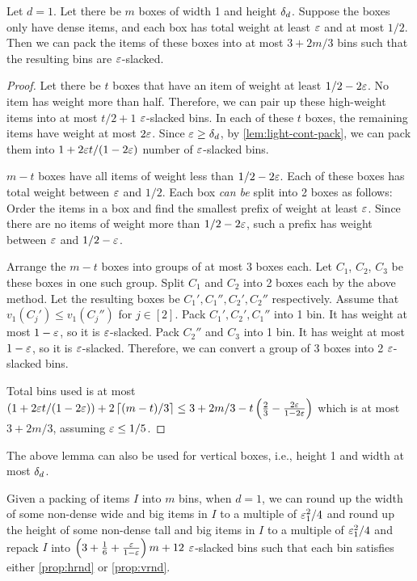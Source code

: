 \begin{lemma}
\label{lem:dense-cont-pack}
Let $d=1$. Let there be $m$ boxes of width 1 and height $\delta_d$.
Suppose the boxes only have dense items,
and each box has total weight at least $\varepsilon$ and at most $1/2$.
Then we can pack the items of these boxes into at most $3 + 2m/3$ bins such that
the resulting bins are $\varepsilon$-slacked.
\end{lemma}
\begin{proof}
Let there be $t$ boxes that have an item of weight at least $1/2-2\varepsilon$.
No item has weight more than half.
Therefore, we can pair up these high-weight items into at most $t/2 + 1$ $\varepsilon$-slacked bins.
In each of these $t$ boxes, the remaining items have weight at most $2\varepsilon$.
Since $\varepsilon \ge \delta_d$, by \cref{lem:light-cont-pack},
we can pack them into $1 + 2\varepsilon t/(1-2\varepsilon)$ number of $\varepsilon$-slacked bins.

$m-t$ boxes have all items of weight less than $1/2-2\varepsilon$.
Each of these boxes has total weight between $\varepsilon$ and $1/2$.
Each box \emph{can be} split into 2 boxes as follows:
Order the items in a box and find the smallest prefix of weight at least $\varepsilon$.
Since there are no items of weight more than $1/2-2\varepsilon$,
such a prefix has weight between $\varepsilon$ and $1/2-\varepsilon$.

Arrange the $m-t$ boxes into groups of at most 3 boxes each.
Let $C_1$, $C_2$, $C_3$ be these boxes in one such group.
Split $C_1$ and $C_2$ into 2 boxes each by the above method.
Let the resulting boxes be $C_1', C_1'', C_2', C_2''$ respectively.
Assume \wLoG{} that $v_1(C_j') \le v_1(C_j'')$ for $j \in [2]$.
Pack $C_1', C_2', C_1''$ into 1 bin. It has weight at most $1-\varepsilon$, so it is $\varepsilon$-slacked.
Pack $C_2''$ and $C_3$ into 1 bin. It has weight at most $1-\varepsilon$, so it is $\varepsilon$-slacked.
Therefore, we can convert a group of 3 boxes into 2 $\varepsilon$-slacked bins.

Total bins used is at most
$\left(1 + 2\varepsilon t/(1-2\varepsilon)\right) + 2\left\lceil (m-t)/3 \right\rceil
\le 3 + 2m/3 - t\left( \frac{2}{3} - \frac{2\varepsilon}{1-2\varepsilon} \right)$
which is at most $3 + 2m/3$, assuming {$\varepsilon \le 1/5$}.
\end{proof}
The above lemma can also be used for vertical boxes,
i.e., height 1 and width at most $\delta_d$.

\begin{lemma}
\label{lem:ws-1-pack}
Given a packing of items $I$ into $m$ bins, when $d=1$, we can
round up the width of some non-dense wide and big items in $I$ to a multiple of $\varepsilon_1^2/4$
and round up the height of some non-dense tall and big items in $I$ to a multiple of $\varepsilon_1^2/4$
and repack $I$ into $\left(3 + \frac{1}{6} + \frac{\varepsilon}{1-\varepsilon}\right)m + 12$
$\varepsilon$-slacked bins such that
each bin satisfies either \cref{prop:hrnd} or \cref{prop:vrnd}.
\end{lemma}

